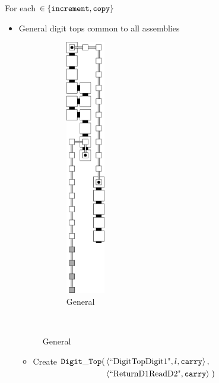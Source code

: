         For each {\inc} $\in \{ {\tt increment, copy } \}$
        \begin{itemize}
            \item General digit tops common to all assemblies

            \begin{figure}[H]
                \centering
                \begin{subfigure}[t]{0.2\textwidth}
                    \centering
                    \includegraphics[width=0.2\textwidth]{warping/digit_top_general}
                    \caption{\label{fig:warping/digit_top_general} General }
                \end{subfigure}%
                ~
            \end{figure}

            \begin{itemize}
                \item Create
                $\begin{aligned}[t]
                    {\tt Digit\_Top}(& \left \langle \text{``DigitTopDigit1"}, l, {\tt carry} \right\rangle, & \\
                          & \left \langle \text{``ReturnD1ReadD2"},    {\tt carry} \right\rangle \;)
                \end{aligned}$
                \vspace{.5cm}


\end{itemize}
\end{itemize}

